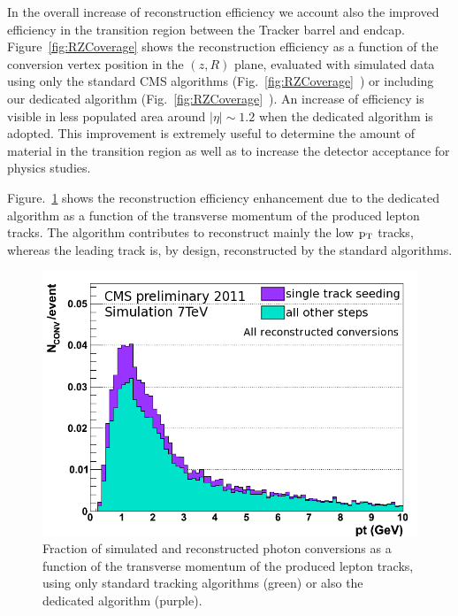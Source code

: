 \documentclass[a4paper]{jpconf}
\begin{document}
In the overall increase of reconstruction efficiency we account also the improved efficiency in the transition region between the Tracker barrel and endcap.  
Figure~\ref{fig:RZCoverage} shows the reconstruction efficiency as a function of the conversion vertex position in the $(z,R)$ plane, evaluated with simulated data using only the standard CMS algorithms (Fig.~\ref{fig:RZCoverage}~) or including our dedicated algorithm (Fig.~\ref{fig:RZCoverage}~). An increase of efficiency is visible in less populated area around $|\eta| \sim 1.2$ when the dedicated algorithm is adopted. This improvement is extremely useful to determine  the amount of material in the transition region as well as to increase the detector acceptance for physics studies.



Figure.~\ref{fig:ptPerf} shows the reconstruction efficiency enhancement due to the  dedicated algorithm as a function of the transverse momentum of the produced lepton tracks. The algorithm contributes to reconstruct mainly the low $\rm p_T$ tracks, whereas the leading track is, by design, reconstructed by the standard algorithms.

\begin{figure}[h]
\begin{center}
\includegraphics[width=.7\textwidth]{fig/algo_pt_Lin_Reco_All_mod.png}
\caption{\label{fig:ptPerf}
Fraction of simulated and reconstructed photon conversions as a function of the transverse momentum of the produced lepton tracks, using only standard tracking algorithms (green) or also the dedicated algorithm (purple). }
\end{center}
\end{figure}
\end{document}
